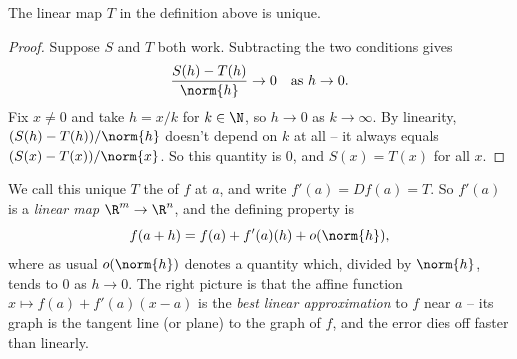 \begin{proposition}
    The linear map $T$ in the definition above is unique.
\end{proposition}
\begin{proof}
    Suppose $S$ and $T$ both work. Subtracting the two conditions gives
    $$
    \frac{S(h) - T(h)}{\norm{h}} \rightarrow 0 \quad \text{as } h \rightarrow 0.
    $$
    Fix $x \neq 0$ and take $h = x/k$ for $k \in \N$, so $h \rightarrow 0$ as $k \rightarrow \infty$. By linearity, $(S(h) - T(h))/\norm{h}$ doesn't depend on $k$ at all -- it always equals $(S(x) - T(x))/\norm{x}$. So this quantity is $0$, and $S(x) = T(x)$ for all $x$.
\end{proof}

We call this unique $T$ the  of $f$ at $a$, and write $f'(a) = Df(a) = T$. So $f'(a)$ is a \emph{linear map} $\R^m \rightarrow \R^n$, and the defining property is
$$
f(a + h) = f(a) + f'(a)(h) + o(\norm{h}),
$$
where as usual $o(\norm{h})$ denotes a quantity which, divided by $\norm{h}$, tends to $0$ as $h \rightarrow 0$. The right picture is that the affine function $x \mapsto f(a) + f'(a)(x - a)$ is the \emph{best linear approximation} to $f$ near $a$ -- its graph is the tangent line (or plane) to the graph of $f$, and the error dies off faster than linearly.

\begin{center}
\end{center}

